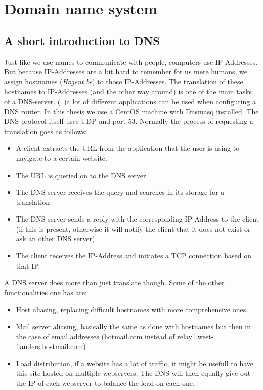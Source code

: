 \section{ Domain name system}
\subsection{A short introduction to DNS}
Just like we use names to communicate with people, computers use IP-Addresses. But because IP-Addresses are a bit hard to remember for us mere humans, we assign hostnames (\textit{Hogent.be}) to those IP-Addresses. The translation of these hostnames to IP-Addresses (and the other way around) is one of the main tasks of a DNS-server. (~\textcite{NetworkingPearson})a lot of different applications can be used when configuring a DNS router. In this thesis we use a CentOS machine with Dnsmasq installed. The DNS protocol itself uses UDP and port 53. Normally the process of requesting a translation goes as follows:
\begin{itemize}
\item A client extracts the URL from the application that the user is using to navigate to a certain website.
\item The URL is queried on to the DNS server
\item The DNS server receives the query and searches in its storage for a translation
\item The DNS server sends a reply with the corresponding IP-Address to the client (if this is present, otherwise it will notify the client that it does not exist or ask an other DNS server)
\item The client receives the IP-Address and initiates a TCP connection based on that IP.
\end{itemize}
A DNS server does more than just translate though. Some of the other functionalities one has are:
\begin{itemize}
\item Host aliasing, replacing difficult hostnames with more comprehensive ones.
\item Mail server aliasing, basically the same as done with hostnames but then in the case of email addresses (hotmail.com instead of relay1.west-flanders.hostmail.com)
\item Load distribution, if a website has a lot of traffic, it might be usefull to have this site hosted on multiple webservers. The DNS will then equally give out the IP of each webserver to balance the load on each one.
\end{itemize}
